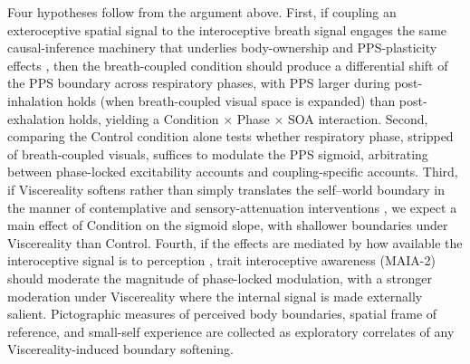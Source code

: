 Four hypotheses follow from the argument above. First, if coupling an exteroceptive spatial signal to the interoceptive breath signal engages the same causal-inference machinery that underlies body-ownership and PPS-plasticity effects \citep{samad_2015, chancel_2021, Ardizzi2018}, then the breath-coupled condition should produce a differential shift of the PPS boundary across respiratory phases, with PPS larger during post-inhalation holds (when breath-coupled visual space is expanded) than post-exhalation holds, yielding a Condition $\times$ Phase $\times$ SOA interaction. Second, comparing the Control condition alone tests whether respiratory phase, stripped of breath-coupled visuals, suffices to modulate the PPS sigmoid, arbitrating between phase-locked excitability accounts \citep{saltafossi_2025, kluger_2021, grund_2021} and coupling-specific accounts. Third, if Viscereality softens rather than simply translates the self--world boundary in the manner of contemplative and sensory-attenuation interventions \citep{Chiarella2024, hanley_2020, hruby_2024, nguyen_2020}, we expect a main effect of Condition on the sigmoid slope, with shallower boundaries under Viscereality than Control. Fourth, if the effects are mediated by how available the interoceptive signal is to perception \citep{Ardizzi2018, salvato_2020, bogdanova_2021, Goral2024}, trait interoceptive awareness (MAIA-2) should moderate the magnitude of phase-locked modulation, with a stronger moderation under Viscereality where the internal signal is made externally salient. Pictographic measures of perceived body boundaries, spatial frame of reference, and small-self experience are collected as exploratory correlates of any Viscereality-induced boundary softening.
